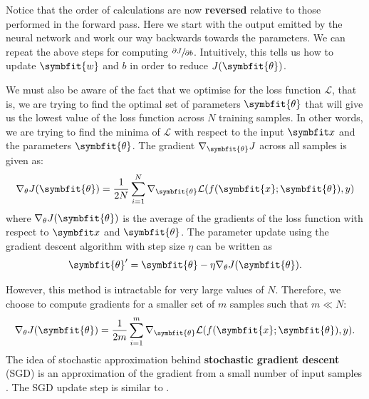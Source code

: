 Notice that the order of calculations are now \textbf{reversed} relative to those performed in the forward pass. Here we start with the output emitted by the neural network and work our way backwards towards the parameters. We can repeat the above steps for computing \(\sfrac{\partial J}{\partial b}\). Intuitively, this tells us how to update $\symbfit{w}$ and $b$ in order to reduce $J(\symbfit{\theta})$.

We must also be aware of the fact that we optimise for the loss function $\mathcal{L}$, that is, we are trying to find the optimal set of parameters $\symbfit{\theta}$ that will give us the lowest value of the loss function across $N$ training samples. In other words, we are trying to find the minima of $\mathcal L$ with respect to the input $\symbfit x$ and the parameters $\symbfit{\theta}$.
The gradient $\nabla_{\symbfit{\theta}}J$ across all samples is given as:
\begin{equation}
    \nabla_{\theta} J(\symbfit{\theta}) = \frac{1}{2N} \sum_{i=1}^{N}\nabla_{\symbfit{\theta}}\mathcal{L}(f(\symbfit{x};\symbfit{\theta}), y)
\end{equation}
where $\nabla_{\theta} J(\symbfit{\theta})$ is the average of the gradients of the loss function with respect to $\symbfit x$ and $\symbfit{\theta}$. The parameter update using the gradient descent algorithm with step size $\eta$ can be written as
\begin{equation}
    \label{eqn:basic-gd}
    \symbfit{\theta}^\prime=\symbfit{\theta}-\eta \nabla_{\theta} J(\symbfit{\theta}).
\end{equation}

However, this method is intractable for very large values of $N$. Therefore, we choose to compute gradients for a smaller set of $m$ samples such that $m \ll N$:
\begin{equation}
    \nabla_{\theta} J(\symbfit{\theta}) = \frac{1}{2m} \sum_{i=1}^{m}\nabla_{\symbfit{\theta}}\mathcal{L}(f(\symbfit{x};\symbfit{\theta}), y).
\end{equation}
The idea of stochastic approximation behind \textbf{stochastic gradient descent} (SGD) is an approximation of the gradient from a small number of input samples \parencite{Bottou2016}. The SGD update step is similar to .

